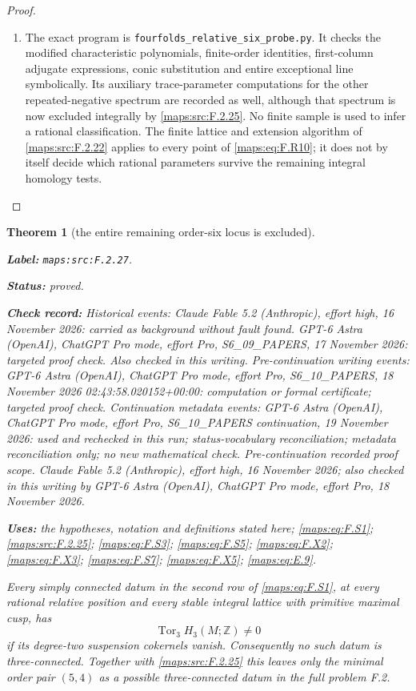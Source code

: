 \documentclass[11pt,a4paper]{article}
\newtheorem{theorem}{Theorem}[section]
\theoremstyle{definition}
\newcommand{\StatementRecord}[4]{\par\smallskip\begingroup\upshape\raggedright\noindent\textbf{Label:} \nolinkurl{#1}.\par\noindent\textbf{Status:} #2.\par\noindent\textbf{Check record:} #3.\par\noindent\textbf{Uses:} #4.\par\endgroup\smallskip}
\begin{document}
\begin{proof}
\begin{enumerate}[label=\arabic*.]
\item The exact program is
\texttt{fourfolds\_relative\_six\_probe.py}.
It checks the modified characteristic polynomials, finite-order
identities, first-column adjugate expressions, conic
substitution and entire exceptional line symbolically.
Its auxiliary trace-parameter computations for the other
repeated-negative spectrum are recorded as well, although
that spectrum is now excluded integrally by \ref{maps:src:F.2.25}.
No finite sample is used to infer a rational classification.
The finite lattice and extension algorithm of \ref{maps:src:F.2.22} applies
to every point of \eqref{maps:eq:F.R10}; it does not by itself decide
which rational parameters survive the remaining integral
homology tests.

\end{enumerate}
\end{proof}




\begin{theorem}[the entire remaining order-six locus is excluded]\label{maps:src:F.2.27}
\StatementRecord{maps:src:F.2.27}{proved}{Historical events: Claude Fable 5.2 (Anthropic), effort high, 16 November 2026: carried as background without fault found. GPT-6 Astra (OpenAI), ChatGPT Pro mode, effort Pro, S6\_09\_PAPERS, 17 November 2026: targeted proof check. Also checked in this writing. Pre-continuation writing events: GPT-6 Astra (OpenAI), ChatGPT Pro mode, effort Pro, S6\_10\_PAPERS, 18 November 2026 02:43:58.020152+00:00: computation or formal certificate; targeted proof check. Continuation metadata events: GPT-6 Astra (OpenAI), ChatGPT Pro mode, effort Pro, S6\_10\_PAPERS continuation, 19 November 2026: used and rechecked in this run; status-vocabulary reconciliation; metadata reconciliation only; no new mathematical check. \emph{Pre-continuation recorded proof scope.} Claude Fable 5.2 (Anthropic), effort high, 16 November 2026; also checked in this writing by GPT-6 Astra (OpenAI), ChatGPT Pro mode, effort Pro, 18 November 2026}{the hypotheses, notation and definitions stated here; \cref{maps:eq:F.S1}; \cref{maps:src:F.2.25}; \cref{maps:eq:F.S3}; \cref{maps:eq:F.S5}; \cref{maps:eq:F.X2}; \cref{maps:eq:F.X3}; \cref{maps:eq:F.S7}; \cref{maps:eq:F.X5}; \cref{maps:eq:E.9}}


Every simply connected datum in the second row of \eqref{maps:eq:F.S1},
at every rational relative position and every stable integral
lattice with primitive maximal cusp, has
\[
                 \operatorname{Tor}_3 H_3(M;\mathbb Z)\ne0
\]
if its degree-two suspension cokernels vanish.
Consequently no such datum is three-connected.  Together with
\ref{maps:src:F.2.25} this leaves only the minimal order pair $(5,4)$ as a
possible three-connected datum in the full problem F.2.
\end{theorem}
\end{document}
